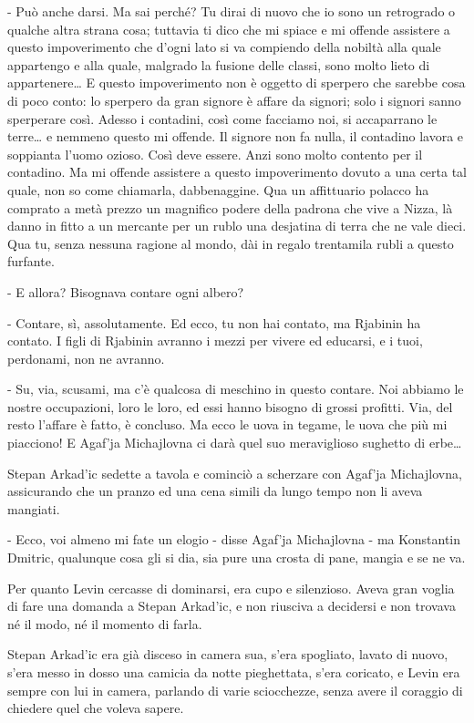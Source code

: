 - Può anche darsi. Ma sai perché? Tu dirai di nuovo che io sono un retrogrado o qualche altra strana cosa; tuttavia ti dico che mi spiace e mi offende assistere a questo impoverimento che d'ogni lato si va compiendo della nobiltà alla quale appartengo e alla quale, malgrado la fusione delle classi, sono molto lieto di appartenere\ldots{} E questo impoverimento non è oggetto di sperpero che sarebbe cosa di poco conto: lo sperpero da gran signore è affare da signori; solo i signori sanno sperperare così. Adesso i contadini, così come facciamo noi, si accaparrano le terre\ldots{} e nemmeno questo mi offende. Il signore non fa nulla, il contadino lavora e soppianta l'uomo ozioso. Così deve essere. Anzi sono molto contento per il contadino. Ma mi offende assistere a questo impoverimento dovuto a una certa tal quale, non so come chiamarla, dabbenaggine. Qua un affittuario polacco ha comprato a metà prezzo un magnifico podere della padrona che vive a Nizza, là danno in fitto a un mercante per un rublo una desjatina di terra che ne vale dieci. Qua tu, senza nessuna ragione al mondo, dài in regalo trentamila rubli a questo furfante. 

- E allora? Bisognava contare ogni albero? 

- Contare, sì, assolutamente. Ed ecco, tu non hai contato, ma Rjabinin ha contato. I figli di Rjabinin avranno i mezzi per vivere ed educarsi, e i tuoi, perdonami, non ne avranno. 
\enlargethispage{\baselineskip}

- Su, via, scusami, ma c'è qualcosa di meschino in questo contare. Noi abbiamo le nostre occupazioni, loro le loro, ed essi hanno bisogno di grossi profitti. Via, del resto l'affare è fatto, è concluso. Ma ecco le uova in tegame, le uova che più mi piacciono! E Agaf'ja Michajlovna ci darà quel suo meraviglioso sughetto di erbe\ldots{} 

Stepan Arkad'ic sedette a tavola e cominciò a scherzare con Agaf'ja Michajlovna, assicurando che un pranzo ed una cena simili da lungo tempo non li aveva mangiati. 

- Ecco, voi almeno mi fate un elogio - disse Agaf'ja Michajlovna - ma Konstantin Dmitric, qualunque cosa gli si dia, sia pure una crosta di pane, mangia e se ne va. 

Per quanto Levin cercasse di dominarsi, era cupo e silenzioso. Aveva gran voglia di fare una domanda a Stepan Arkad'ic, e non riusciva a decidersi e non trovava né il modo, né il momento di farla. 

Stepan Arkad'ic era già disceso in camera sua, s'era spogliato, lavato di nuovo, s'era messo in dosso una camicia da notte pieghettata, s'era coricato, e Levin era sempre con lui in camera, parlando di varie sciocchezze, senza avere il coraggio di chiedere quel che voleva sapere. 

